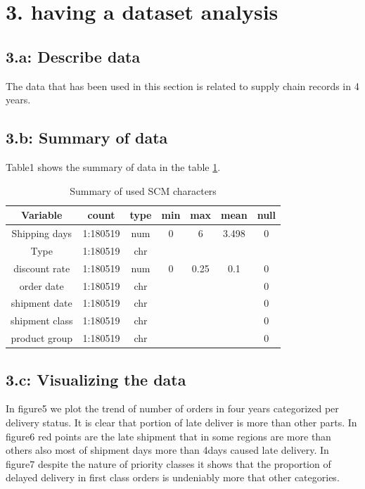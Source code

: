 \documentclass[a4paper, 11pt]{article}
\begin{document}
\newpage
\section*{3. having a dataset analysis}
\subsection*{3.a: Describe data}
The data that has been used in this section is related to supply chain records in 4 years.~\cite{scm}

\subsection*{3.b: Summary of data}
Table1 shows the summary of data in the table \ref{sumInfo}.
\begin{table}[H]
	\centering
	\caption{Summary of used SCM characters}
	\label{sumInfo}
	\begin{tabular}{|c|c|c|c|c|c|c|}
		\hline
		\textbf{Variable} & \textbf{count} &  \textbf{type} &  \textbf{min} &  \textbf{max} &  \textbf{mean} &  \textbf{null} \\
		\hline		
		Shipping days & 1:180519 & num & 0 & 6 & 3.498 & 0\\
		Type & 1:180519 & chr &  &  &  & \\
		discount rate & 1:180519 & num & 0 & 0.25 & 0.1 & 0\\
		order date & 1:180519 & chr &  &  &  & 0\\
		shipment date & 1:180519 & chr &  &  &  & 0\\
		shipment class & 1:180519 & chr &  &  &  & 0\\
		product group & 1:180519 & chr &  &  &  & 0\\
		\hline 
	\end{tabular}
\end{table}


\subsection*{3.c: Visualizing the data}
In figure5 we plot the trend of number of orders in four years categorized per delivery status. It is clear that portion of late deliver is more than other parts.
In figure6 red points are the late shipment that in some regions are more than others also most of shipment days more than 4days caused late delivery.
In figure7 despite the nature of priority classes it shows that the proportion of delayed delivery in first class orders is undeniably more that other categories. 
\end{document}
